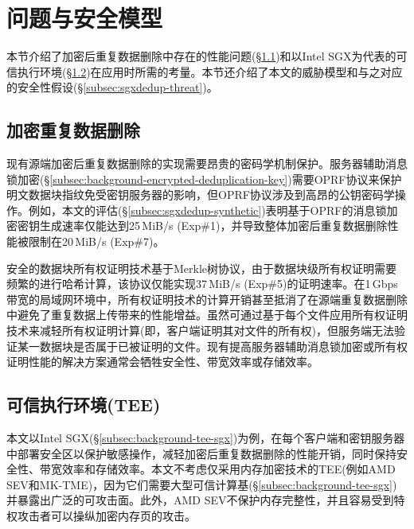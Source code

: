 \section{问题与安全模型}
\label{sec:sgxdedup-background}

本节介绍了加密后重复数据删除中存在的性能问题(\S\ref{subsec:sgxdedup-problem})和以Intel SGX为代表的可信执行环境(\S\ref{subsec:sgxdedup-sgx})在应用时所需的考量。本节还介绍了本文的威胁模型和与之对应的安全性假设(\S\ref{subsec:sgxdedup-threat})。

\subsection{加密重复数据删除}
\label{subsec:sgxdedup-problem}

现有源端加密后重复数据删除的实现需要昂贵的密码学机制保护。服务器辅助消息锁加密(\S\ref{subsec:background-encrypted-deduplication-key})需要OPRF协议来保护明文数据块指纹免受密钥服务器的影响，但OPRF协议涉及到高昂的公钥密码学操作。例如，本文的评估(\S\ref{subsec:sgxdedup-synthetic})表明基于OPRF的消息锁加密密钥生成速率仅能达到25\,MiB/s (Exp\#1)，并导致整体加密后重复数据删除性能被限制在20\,MiB/s (Exp\#7)。

安全的数据块所有权证明技术基于Merkle树协议，由于数据块级所有权证明需要频繁的进行哈希计算，该协议仅能实现37\,MiB/s (Exp\#5)的证明速率。在1\,Gbps带宽的局域网环境中，所有权证明技术的计算开销甚至抵消了在源端重复数据删除中避免了重复数据上传带来的性能增益。虽然可通过基于每个文件应用所有权证明技术来减轻所有权证明计算(即，客户端证明其对文件的所有权)，但服务端无法验证某一数据块是否属于已被证明的文件。现有提高服务器辅助消息锁加密或所有权证明性能的解决方案通常会牺牲安全性、带宽效率或存储效率。


\subsection{可信执行环境(TEE)}
\label{subsec:sgxdedup-sgx}

本文以Intel SGX(\S\ref{subsec:background-tee-sgx})为例，在每个客户端和密钥服务器中部署安全区以保护敏感操作，减轻加密后重复数据删除的性能开销，同时保持安全性、带宽效率和存储效率。本文不考虑仅采用内存加密技术的TEE(例如AMD SEV和MK-TME)，因为它们需要大型可信计算基(\S\ref{subsec:background-tee-sgx})并暴露出广泛的可攻击面。此外，AMD SEV不保护内存完整性，并且容易受到特权攻击者可以操纵加密内存页的攻击。


